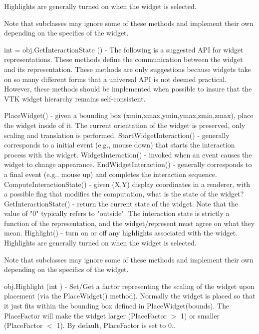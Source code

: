 \begin{DoxyItemize}
\begin{DoxyPre}
               Highlights are generally turned on when the widget is selected.
 \end{DoxyPre}
 Note that subclasses may ignore some of these methods and implement their own depending on the specifics of the widget.  
\item {\ttfamily int = obj.\-Get\-Interaction\-State ()} -\/ The following is a suggested A\-P\-I for widget representations. These methods define the communication between the widget and its representation. These methods are only suggestions because widgets take on so many different forms that a universal A\-P\-I is not deemed practical. However, these methods should be implemented when possible to insure that the V\-T\-K widget hierarchy remains self-\/consistent. 
\begin{DoxyPre}
 PlaceWidget() - given a bounding box (xmin,xmax,ymin,ymax,zmin,zmax), place 
                 the widget inside of it. The current orientation of the widget 
                 is preserved, only scaling and translation is performed.
 StartWidgetInteraction() - generally corresponds to a initial event (e.g.,
                            mouse down) that starts the interaction process
                            with the widget.
 WidgetInteraction() - invoked when an event causes the widget to change 
                       appearance.
 EndWidgetInteraction() - generally corresponds to a final event (e.g., mouse up)
                          and completes the interaction sequence.
 ComputeInteractionState() - given (X,Y) display coordinates in a renderer, with a
                             possible flag that modifies the computation,
                             what is the state of the widget?
 GetInteractionState() - return the current state of the widget. Note that the
                         value of "0" typically refers to "outside". The 
                         interaction state is strictly a function of the
                         representation, and the widget/represent must agree
                         on what they mean.
 Highlight() - turn on or off any highlights associated with the widget.
               Highlights are generally turned on when the widget is selected.
 \end{DoxyPre}
 Note that subclasses may ignore some of these methods and implement their own depending on the specifics of the widget.  
\item {\ttfamily obj.\-Highlight (int )} -\/ Set/\-Get a factor representing the scaling of the widget upon placement (via the Place\-Widget() method). Normally the widget is placed so that it just fits within the bounding box defined in Place\-Widget(bounds). The Place\-Factor will make the widget larger (Place\-Factor $>$ 1) or smaller (Place\-Factor $<$ 1). By default, Place\-Factor is set to 0..  

\end{DoxyItemize}
